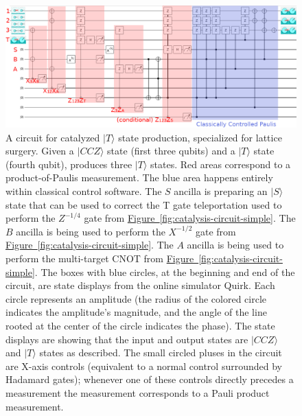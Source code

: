 \documentclass[twocolumn,accepted=2019-03-30]{quantumarticle}
\newcommand{\fig}[1]{\hyperref[fig:#1]{Figure~\ref*{fig:#1}}}
\begin{document}
\begin{figure}
    \label{fig:catalysis-circuit}
    \centering
    \includegraphics[width=\textwidth,height=\dimexpr\textheight-11\baselineskip,keepaspectratio]{catalysis-circuit.png}
    \caption{
      A circuit for catalyzed $|T\rangle$ state production, specialized for lattice surgery.
      Given a $|CCZ\rangle$ state (first three qubits) and a $|T\rangle$ state (fourth qubit), produces three $|T\rangle$ states.
      Red areas correspond to a product-of-Paulis measurement.
      The blue area happens entirely within classical control software.
      The $S$ ancilla is preparing an $|S\rangle$ state that can be used to correct the T gate teleportation used to perform the $Z^{-1/4}$ gate from \fig{catalysis-circuit-simple}.
      The $B$ ancilla is being used to perform the $X^{-1/2}$ gate from \fig{catalysis-circuit-simple}.
      The $A$ ancilla is being used to perform the multi-target CNOT from \fig{catalysis-circuit-simple}.
      The boxes with blue circles, at the beginning and end of the circuit, are state displays from the online simulator Quirk.
      Each circle represents an amplitude (the radius of the colored circle indicates the amplitude's magnitude, and the angle of the line rooted at the center of the circle indicates the phase).
      The state displays are showing that the input and output states are $|CCZ\rangle$ and $|T\rangle$ states as described.
      The small circled pluses in the circuit are X-axis controls (equivalent to a normal control surrounded by Hadamard gates); whenever one of these controls directly precedes a measurement the measurement corresponds to a Pauli product measurement.
}
\end{figure}
\end{document}
